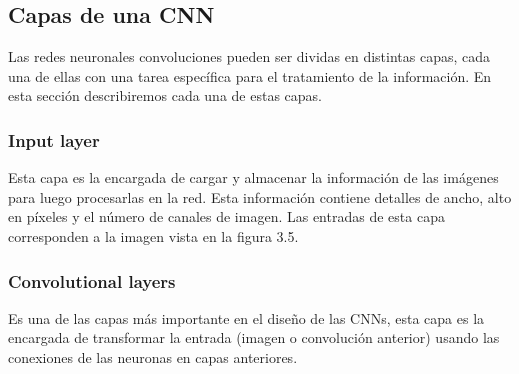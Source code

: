 \subsection{Capas de una CNN}
Las redes neuronales convoluciones pueden ser dividas en distintas capas, cada una de ellas con una tarea específica para el tratamiento de la información. En esta sección describiremos cada una de estas capas.
\subsubsection{Input layer}
Esta capa es la encargada de cargar y almacenar la información de las imágenes para luego procesarlas en la red. Esta información contiene detalles de ancho, alto en píxeles y el número de canales de imagen. Las entradas de esta capa corresponden a la imagen vista en la figura 3.5.

\subsubsection{Convolutional layers}
Es una de las capas más importante en el diseño de las CNNs, esta capa es la encargada de transformar la entrada (imagen o convolución anterior) usando las conexiones de las neuronas en capas anteriores. 

